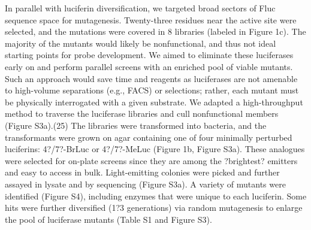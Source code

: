 In parallel with luciferin diversification, we targeted broad sectors of Fluc sequence space for mutagenesis. Twenty-three residues near the active site were selected, and the mutations were covered in 8 libraries (labeled in Figure 1c). The majority of the mutants would likely be nonfunctional, and thus not ideal starting points for probe development. We aimed to eliminate these luciferases early on and perform parallel screens with an enriched pool of viable mutants. Such an approach would save time and reagents as luciferases are not amenable to high-volume separations (e.g., FACS) or selections; rather, each mutant must be physically interrogated with a given substrate. We adapted a high-throughput method to traverse the luciferase libraries and cull nonfunctional members (Figure S3a).(25) The libraries were transformed into bacteria, and the transformants were grown on agar containing one of four minimally perturbed luciferins: 4?/7?-BrLuc or 4?/7?-MeLuc (Figure 1b, Figure S3a). These analogues were selected for on-plate screens since they are among the ?brightest? emitters and easy to access in bulk. Light-emitting colonies were picked and further assayed in lysate and by sequencing (Figure S3a). A variety of mutants were identified (Figure S4), including enzymes that were unique to each luciferin. Some hits were further diversified (1?3 generations) via random mutagenesis to enlarge the pool of luciferase mutants (Table S1 and Figure S3).


